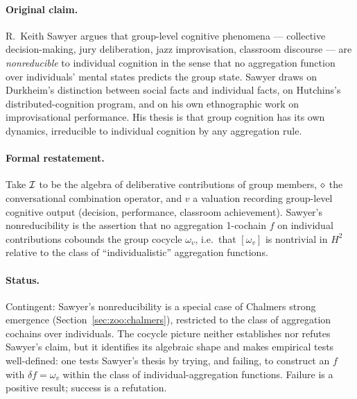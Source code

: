 \paragraph{Original claim.} R.\ Keith Sawyer \cite{Sawyer2005} argues that
group-level cognitive phenomena --- collective decision-making, jury
deliberation, jazz improvisation, classroom discourse --- are
\emph{nonreducible} to individual cognition in the sense that no aggregation
function over individuals' mental states predicts the group state. Sawyer
draws on Durkheim's distinction between social facts and individual facts,
on Hutchins's distributed-cognition program, and on his own ethnographic
work on improvisational performance. His thesis is that group cognition has
its own dynamics, irreducible to individual cognition by any aggregation rule.

\paragraph{Formal restatement.} Take $\mathcal{I}$ to be the algebra of
deliberative contributions of group members, $\mathbin{\diamond}$ the conversational
combination operator, and $v$ a valuation recording group-level cognitive
output (decision, performance, classroom achievement). Sawyer's
nonreducibility is the assertion that no aggregation 1-cochain $f$ on
individual contributions cobounds the group cocycle $\omega_v$, i.e.\ that
$[\omega_v]$ is nontrivial in $H^2$ relative to the class of
``individualistic'' aggregation functions.

\paragraph{Status.} Contingent: Sawyer's nonreducibility is a special case
of Chalmers strong emergence (Section~\ref{sec:zoo:chalmers}), restricted
to the class of aggregation cochains over individuals. The cocycle picture
neither establishes nor refutes Sawyer's claim, but it identifies its
algebraic shape and makes empirical tests well-defined: one tests Sawyer's
thesis by trying, and failing, to construct an $f$ with $\delta f = \omega_v$
within the class of individual-aggregation functions. Failure is a positive
result; success is a refutation.

